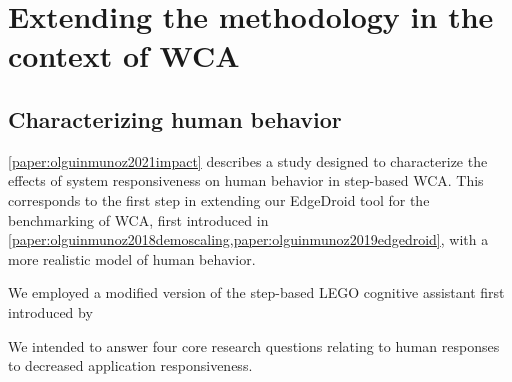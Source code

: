 \section{Extending the methodology in the context of \acs{WCA}}


\subsection{Characterizing human behavior}

\cref{paper:olguinmunoz2021impact} describes a study designed to characterize the effects of system responsiveness on
human behavior in step-based \ac{WCA}.
This corresponds to the first step in extending our EdgeDroid tool for the benchmarking of \ac{WCA}, first introduced
in \cref{paper:olguinmunoz2018demoscaling,paper:olguinmunoz2019edgedroid}, with a more realistic model of human
behavior.

We employed a modified version of the step-based LEGO cognitive assistant first introduced by \citeauthor{chen2015early}




We intended to answer four core research questions relating to human responses to decreased application responsiveness.

